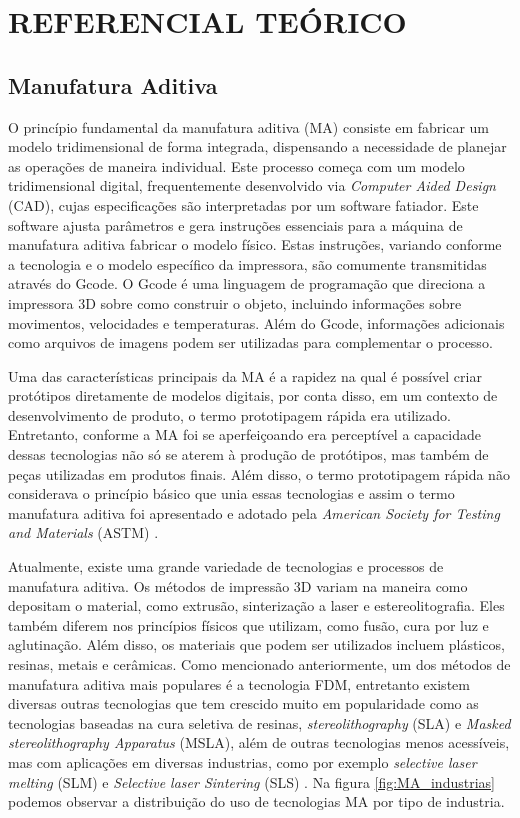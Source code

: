 \chapter{REFERENCIAL TEÓRICO}

\section{Manufatura Aditiva}
O princípio fundamental da manufatura aditiva (MA) consiste em fabricar um modelo tridimensional de forma integrada, dispensando a necessidade de planejar as operações de maneira individual. Este processo começa com um modelo tridimensional digital, frequentemente desenvolvido via \textit{Computer Aided Design} (CAD), cujas especificações são interpretadas por um software fatiador. Este software ajusta parâmetros e gera instruções essenciais para a máquina de manufatura aditiva fabricar o modelo físico. Estas instruções, variando conforme a tecnologia e o modelo específico da impressora, são comumente transmitidas através do Gcode. O Gcode é uma linguagem de programação que direciona a impressora 3D sobre como construir o objeto, incluindo informações sobre movimentos, velocidades e temperaturas. Além do Gcode, informações adicionais como arquivos de imagens podem ser utilizadas para complementar o processo.

Uma das características principais da MA é a rapidez na qual é possível criar protótipos diretamente de modelos digitais, por conta disso, em um contexto de desenvolvimento de produto, o termo prototipagem rápida era utilizado. Entretanto, conforme a MA foi se aperfeiçoando era perceptível a capacidade dessas tecnologias não só se aterem à produção de protótipos, mas também de peças utilizadas em produtos finais. Além disso, o termo prototipagem rápida não considerava o princípio básico que unia essas tecnologias e assim o termo manufatura aditiva foi apresentado e adotado pela \textit{American Society for Testing and Materials} (ASTM) \cite{gibson15}.

Atualmente, existe uma grande variedade de tecnologias e processos de manufatura aditiva. Os métodos de impressão 3D variam na maneira como depositam o material, como extrusão, sinterização a  laser e estereolitografia. Eles também diferem nos princípios físicos que utilizam, como fusão, cura por luz e aglutinação. Além disso, os materiais que podem ser utilizados incluem plásticos, resinas, metais e cerâmicas. Como mencionado anteriormente, um dos métodos de manufatura aditiva mais populares é a tecnologia FDM, entretanto existem diversas outras tecnologias que tem crescido muito em popularidade como as tecnologias baseadas na cura seletiva de resinas, \textit{stereolithography} (SLA) e \textit{Masked stereolithography Apparatus} (MSLA), além de outras tecnologias menos acessíveis, mas com aplicações em diversas industrias, como por exemplo \textit{selective laser melting} (SLM) e \textit{Selective laser Sintering} (SLS) \cite{bikas16}. Na figura \ref{fig:MA_industrias} podemos observar a distribuição do uso de tecnologias MA por tipo de industria.   

